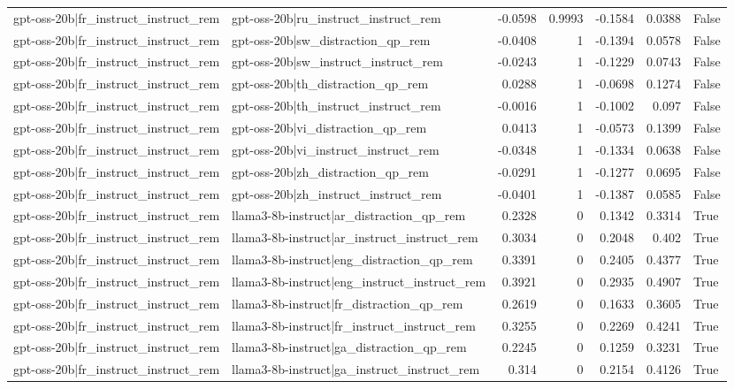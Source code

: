 \begin{table}
\begin{tabular}{l l r r r r l}
gpt-oss-20b|fr_instruct_instruct_rem & gpt-oss-20b|ru_instruct_instruct_rem & -0.0598 & 0.9993 & -0.1584 & 0.0388 & False \\
gpt-oss-20b|fr_instruct_instruct_rem & gpt-oss-20b|sw_distraction_qp_rem & -0.0408 & 1 & -0.1394 & 0.0578 & False \\
gpt-oss-20b|fr_instruct_instruct_rem & gpt-oss-20b|sw_instruct_instruct_rem & -0.0243 & 1 & -0.1229 & 0.0743 & False \\
gpt-oss-20b|fr_instruct_instruct_rem & gpt-oss-20b|th_distraction_qp_rem & 0.0288 & 1 & -0.0698 & 0.1274 & False \\
gpt-oss-20b|fr_instruct_instruct_rem & gpt-oss-20b|th_instruct_instruct_rem & -0.0016 & 1 & -0.1002 & 0.097 & False \\
gpt-oss-20b|fr_instruct_instruct_rem & gpt-oss-20b|vi_distraction_qp_rem & 0.0413 & 1 & -0.0573 & 0.1399 & False \\
gpt-oss-20b|fr_instruct_instruct_rem & gpt-oss-20b|vi_instruct_instruct_rem & -0.0348 & 1 & -0.1334 & 0.0638 & False \\
gpt-oss-20b|fr_instruct_instruct_rem & gpt-oss-20b|zh_distraction_qp_rem & -0.0291 & 1 & -0.1277 & 0.0695 & False \\
gpt-oss-20b|fr_instruct_instruct_rem & gpt-oss-20b|zh_instruct_instruct_rem & -0.0401 & 1 & -0.1387 & 0.0585 & False \\
gpt-oss-20b|fr_instruct_instruct_rem & llama3-8b-instruct|ar_distraction_qp_rem & 0.2328 & 0 & 0.1342 & 0.3314 & True \\
gpt-oss-20b|fr_instruct_instruct_rem & llama3-8b-instruct|ar_instruct_instruct_rem & 0.3034 & 0 & 0.2048 & 0.402 & True \\
gpt-oss-20b|fr_instruct_instruct_rem & llama3-8b-instruct|eng_distraction_qp_rem & 0.3391 & 0 & 0.2405 & 0.4377 & True \\
gpt-oss-20b|fr_instruct_instruct_rem & llama3-8b-instruct|eng_instruct_instruct_rem & 0.3921 & 0 & 0.2935 & 0.4907 & True \\
gpt-oss-20b|fr_instruct_instruct_rem & llama3-8b-instruct|fr_distraction_qp_rem & 0.2619 & 0 & 0.1633 & 0.3605 & True \\
gpt-oss-20b|fr_instruct_instruct_rem & llama3-8b-instruct|fr_instruct_instruct_rem & 0.3255 & 0 & 0.2269 & 0.4241 & True \\
gpt-oss-20b|fr_instruct_instruct_rem & llama3-8b-instruct|ga_distraction_qp_rem & 0.2245 & 0 & 0.1259 & 0.3231 & True \\
gpt-oss-20b|fr_instruct_instruct_rem & llama3-8b-instruct|ga_instruct_instruct_rem & 0.314 & 0 & 0.2154 & 0.4126 & True \\

\end{tabular}
\end{table}
